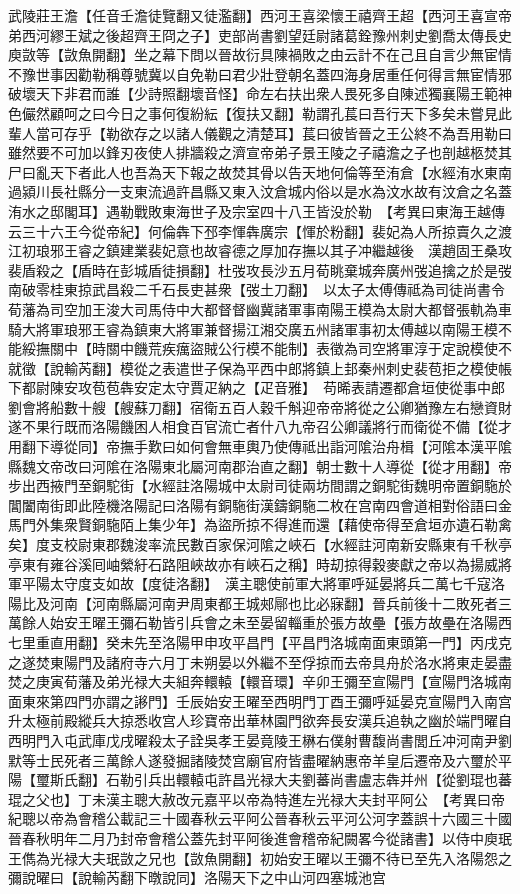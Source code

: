 武陵莊王澹【任音壬澹徒覽翻又徒濫翻】西河王喜梁懷王禧齊王超【西河王喜宣帝弟西河繆王斌之後超齊王冏之子】吏部尚書劉望廷尉諸葛銓豫州刺史劉喬太傳長史庾敳等【敳魚開翻】坐之幕下問以晉故衍具陳禍敗之由云計不在己且自言少無宦情不豫世事因勸勒稱尊號冀以自免勒曰君少壯登朝名蓋四海身居重任何得言無宦情邪破壞天下非君而誰【少詩照翻壞音怪】命左右扶出衆人畏死多自陳述獨襄陽王範神色儼然顧呵之曰今日之事何復紛紜【復扶又翻】勒謂孔萇曰吾行天下多矣未嘗見此輩人當可存乎【勒欲存之以諸人儀觀之清楚耳】萇曰彼皆晉之王公終不為吾用勒曰雖然要不可加以鋒刃夜使人排牆殺之濟宣帝弟子景王陵之子禧澹之子也剖越柩焚其尸曰亂天下者此人也吾為天下報之故焚其骨以告天地何倫等至洧倉【水經洧水東南過潁川長社縣分一支東流過許昌縣又東入汶倉城内俗以是水為汶水故有汶倉之名蓋洧水之邸閣耳】遇勒戰敗東海世子及宗室四十八王皆没於勒　【考異曰東海王越傳云三十六王今從帝紀】何倫犇下邳李惲犇廣宗【惲於粉翻】裴妃為人所掠賣久之渡江初琅邪王睿之鎮建業裴妃意也故睿德之厚加存撫以其子冲繼越後　漢趙固王桑攻裴盾殺之【盾時在彭城盾徒損翻】杜弢攻長沙五月荀眺棄城奔廣州弢追擒之於是弢南破零桂東掠武昌殺二千石長吏甚衆【弢土刀翻】　以太子太傅傳祗為司徒尚書令荀藩為司空加王浚大司馬侍中大都督督幽冀諸軍事南陽王模為太尉大都督張軌為車騎大將軍琅邪王睿為鎮東大將軍兼督揚江湘交廣五州諸軍事初太傅越以南陽王模不能綏撫關中【時關中饑荒疾癘盜賊公行模不能制】表徵為司空將軍淳于定說模使不就徵【說輸芮翻】模從之表遣世子保為平西中郎將鎮上邽秦州刺史裴苞拒之模使帳下都尉陳安攻苞苞犇安定太守賈疋納之【疋音雅】　苟晞表請遷都倉垣使從事中郎劉會將船數十艘【艘蘇刀翻】宿衛五百人穀千斛迎帝帝將從之公卿猶豫左右戀資財遂不果行既而洛陽饑困人相食百官流亡者什八九帝召公卿議將行而衛從不備【從才用翻下導從同】帝撫手歎曰如何會無車輿乃使傳祗出詣河隂治舟楫【河隂本漢平隂縣魏文帝改曰河隂在洛陽東北屬河南郡治直之翻】朝士數十人導從【從才用翻】帝步出西掖門至銅駝街【水經註洛陽城中太尉司徒兩坊間謂之銅駝街魏明帝置銅駞於閶闔南街即此陸機洛陽記曰洛陽有銅駞街漢鑄銅駞二枚在宫南四會道相對俗語曰金馬門外集衆賢銅駞陌上集少年】為盜所掠不得進而還【藉使帝得至倉垣亦遺石勒禽矣】度支校尉東郡魏浚率流民數百家保河隂之峽石【水經註河南新安縣東有千秋亭亭東有雍谷溪囘岫縈紆石路阻峽故亦有峽石之稱】時刧掠得穀麥獻之帝以為揚威將軍平陽太守度支如故【度徒洛翻】　漢主聰使前軍大將軍呼延晏將兵二萬七千寇洛陽比及河南【河南縣屬河南尹周東都王城郟鄏也比必寐翻】晉兵前後十二敗死者三萬餘人始安王曜王彌石勒皆引兵會之未至晏留輜重於張方故壘【張方故壘在洛陽西七里重直用翻】癸未先至洛陽甲申攻平昌門【平昌門洛城南面東頭第一門】丙戌克之遂焚東陽門及諸府寺六月丁未朔晏以外繼不至俘掠而去帝具舟於洛水將東走晏盡焚之庚寅荀藩及弟光禄大夫組奔轘轅【轘音環】辛卯王彌至宣陽門【宣陽門洛城南面東來第四門亦謂之謻門】壬辰始安王曜至西明門丁酉王彌呼延晏克宣陽門入南宫升太極前殿縱兵大掠悉收宫人珍寶帝出華林園門欲奔長安漢兵追執之幽於端門曜自西明門入屯武庫戊戌曜殺太子詮吳孝王晏竟陵王楙右僕射曹馥尚書閭丘冲河南尹劉默等士民死者三萬餘人遂發掘諸陵焚宫廟官府皆盡曜納惠帝羊皇后遷帝及六璽於平陽【璽斯氏翻】石勒引兵出轘轅屯許昌光禄大夫劉蕃尚書盧志犇并州【從劉琨也蕃琨之父也】丁未漢主聰大赦改元嘉平以帝為特進左光禄大夫封平阿公　【考異曰帝紀聰以帝為會稽公載記三十國春秋云平阿公晉春秋云平河公河字蓋誤十六國三十國晉春秋明年二月乃封帝會稽公蓋先封平阿後進會稽帝紀闕畧今從諸書】以侍中庾珉王儁為光禄大夫珉敳之兄也【敳魚開翻】初始安王曜以王彌不待已至先入洛陽怨之彌說曜曰【說輸芮翻下暾說同】洛陽天下之中山河四塞城池宫